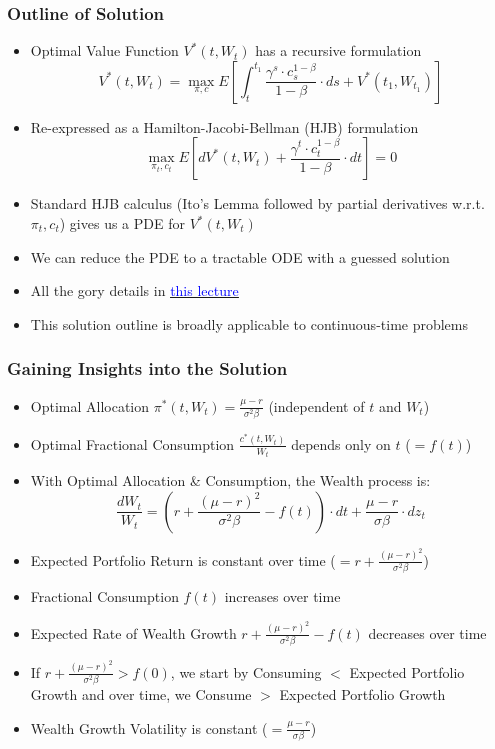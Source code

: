 \documentclass[handout]{beamer}
\begin{document}
\begin{frame}
\frametitle{Outline of Solution}
\pause
\begin{itemize}[<+->]
\item Optimal Value Function $V^*(t, W_t)$ has a recursive formulation
$$V^*(t, W_t) = \max_{\pi, c} E[\int_t^{t_1} \frac {\gamma^s \cdot c_s^{1-\beta}} {1 - \beta} \cdot ds + V^*(t_1, W_{t_1})]$$
\item Re-expressed as a Hamilton-Jacobi-Bellman (HJB) formulation
$$\max_{\pi_t, c_t} E[dV^*(t, W_t) + \frac {\gamma^t \cdot c_t^{1-\beta}}{1 - \beta} \cdot dt] = 0$$
\item Standard HJB calculus (Ito's Lemma followed by partial derivatives w.r.t. $\pi_t, c_t$) gives us a PDE for $V^*(t, W_t)$
\item We can reduce the PDE to a tractable ODE with a guessed solution
\item All the gory details in \href{https://github.com/coverdrive/technical-documents/blob/master/finance/cme241/MertonPortfolio.pdf}{\underline{\textcolor{blue}{this lecture}}}
\item This solution outline is broadly applicable to continuous-time problems
\end{itemize}
\end{frame}

\begin{frame}
\frametitle{Gaining Insights into the Solution}
\begin{itemize}
\item Optimal Allocation $\pi^*(t, W_t) = \frac {\mu - r} {\sigma^2 \beta}$ (independent of $t$ and $W_t$)
\item Optimal Fractional Consumption $\frac {c^*(t, W_t)} {W_t}$ depends only on $t$ ($= f(t)$)
\item With Optimal Allocation \& Consumption, the Wealth process is:
$$\frac {dW_t} {W_t} = (r + \frac {(\mu - r)^2} {\sigma^2 \beta} - f(t)) \cdot dt + \frac {\mu - r} {\sigma \beta} \cdot dz_t$$
\item Expected Portfolio Return is constant over time ($=r + \frac {(\mu - r)^2} {\sigma^2 \beta}$)
\item Fractional Consumption $f(t)$ increases over time
\item Expected Rate of Wealth Growth $r + \frac {(\mu - r)^2} {\sigma^2 \beta} - f(t)$ decreases over time
\item If $r + \frac {(\mu - r)^2} {\sigma^2 \beta} > f(0)$, we start by Consuming $<$ Expected Portfolio Growth and over time, we Consume $>$ Expected Portfolio Growth
\item Wealth Growth Volatility is constant ($= \frac {\mu - r} {\sigma \beta}$)
\end{itemize}
\end{frame}
\end{document}
